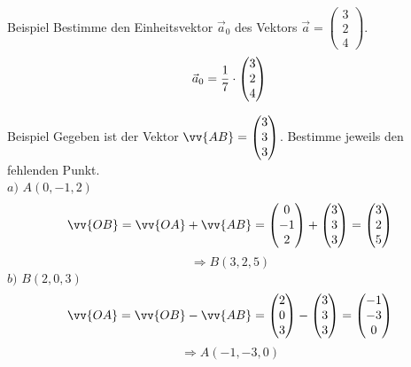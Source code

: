 \documentclass{article}
\begin{document}
\begin{boxx}[DarkBlue]{Beispiel}
    Bestimme den Einheitsvektor $\vec{a}_0$ des Vektors $\vec{a} = \begin{pmatrix}3 \\ 2 \\ 4\end{pmatrix}$.
    \[\vec{a}_0 = \frac{1}{7} \cdot \begin{pmatrix}3\\2\\4\end{pmatrix} \\\]
\end{boxx}
\begin{boxx}[DarkBlue]{Beispiel}
    Gegeben ist der Vektor $\displaystyle \vv{AB} = \begin{pmatrix}3\\3\\3\end{pmatrix}$.
    Bestimme jeweils den fehlenden Punkt. \\
    $a)$\hspace{3mm} $A(0,-1,2)$
    \[\vv{OB} = \vv{OA} + \vv{AB} = \begin{pmatrix}0\\-1\\2\end{pmatrix} + \begin{pmatrix}3\\3\\3\end{pmatrix} = \begin{pmatrix}3\\2\\5\end{pmatrix}\]
    \[\Rightarrow B(3,2,5)\]
    $b)$\hspace{3mm} $B(2,0,3)$
    \[\vv{OA} = \vv{OB} - \vv{AB} = \begin{pmatrix}2\\0\\3\end{pmatrix} - \begin{pmatrix}3\\3\\3\end{pmatrix} = \begin{pmatrix}-1\\-3\\0\end{pmatrix}\]
    \[\Rightarrow A(-1,-3,0)\]
\end{boxx}
\newpage
\end{document}
